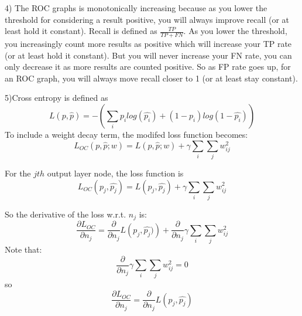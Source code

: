 \documentclass[12pt]{article}
\begin{document}
4) The ROC graphs is monotonically increasing because as you lower the threshold for considering 
a result positive, you will always improve recall (or at least hold it constant). Recall is
defined as $\frac{TP}{TP+FN}$. As you lower the threshold, you increasingly count more 
results as positive which will increase your TP rate (or at least hold it constant). But you 
will never increase your FN rate, you can only decrease it as more results are counted positive. 
So as FP rate goes up, for an ROC graph, you will always move recall closer to 1 (or at least stay 
constant). 

\pagebreak
\setcounter{equation}{0}
5)Cross entropy is defined as 
\begin{equation}
    L(p,\hat{p}) = - \left( \sum_i p_i log\left(\hat{p_i}\right) + (1-p_i)log\left(1-\hat{p_i}\right)\right)
\end{equation}
To include a weight decay term, the modifed loss function becomes: 
\begin{equation}
    L_{OC}(p,\hat{p};w) = L(p,\hat{p};w) + \gamma\sum_i\sum_j w_{ij}^2
\end{equation}


For the $j th$ output layer node, the loss function is
\begin{equation}
    L_{OC}(p_j,\hat{p_j}) = L\left(p_j,\hat{p_j}\right) + \gamma\sum_i\sum_j w_{ij}^2
\end{equation}

So the derivative of the loss w.r.t. $n_j$ is: 
\begin{equation}
    \frac{\partial L_{OC}}{\partial n_j} = \frac{\partial}{\partial n_j}L\left(p_j,\hat{p_j})\right)
    +\frac{\partial}{\partial n_j}\gamma\sum_i\sum_j w_{ij}^2 
\end{equation}
Note that: 
\begin{equation}
    \frac{\partial}{\partial n_j}\gamma\sum_i\sum_j w_{ij}^2 = 0 
\end{equation}
so 
\begin{equation}
    \frac{\partial L_{OC}}{\partial n_j} = \frac{\partial}{\partial n_j}L\left(p_j,\hat{p_j}\right)
\end{equation}
\end{document}
